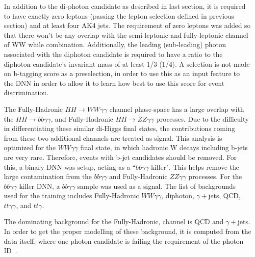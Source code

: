 In addition to the di-photon candidate as described in last section, it is required to have exactly zero leptons (passing the lepton selection defined in previous section) and at least four AK4 jets.
The requirement of zero leptons was added so that there won't be any overlap with the semi-leptonic and fully-leptonic channel of WW while combination.
Additionally, the leading (sub-leading) photon \pt associated with the diphoton candidate is required to have a ratio to the diphoton candidate's 
invariant mass of at least 1/3 (1/4). A selection is not made on b-tagging score as a preselection, in order to use this as an input feature to the DNN in order to allow it to learn how best to use this score for event discrimination.

The Fully-Hadronic $HH\rightarrow WW\gamma\gamma$ channel phase-space has a large overlap with the $HH\rightarrow bb\gamma\gamma$,
and Fully-Hadronic $HH\rightarrow ZZ\gamma\gamma$ processes. Due to the difficulty in differentiating these similar di-Higgs final states, the contributions coming from these two additional channels
are treated as signal. This analysis is optimized for the $WW\gamma\gamma$ final state, in which hadronic W decays including b-jets are very rare. Therefore, events with b-jet candidates should be removed.
For this, a binary DNN was setup, acting as a ``$bb\gamma\gamma$ killer".
This helps remove the large contamination from the $bb\gamma\gamma$ and Fully-Hadronic $ZZ\gamma\gamma$ processes.
For the $bb\gamma\gamma$ killer DNN, a $bb\gamma\gamma$ sample was used as a signal. The list
of backgrounds used for the training includes Fully-Hadronic $WW\gamma\gamma$, diphoton, $\gamma+$jets, QCD, $tt\gamma\gamma$, and $tt\gamma$.

The dominating background for the Fully-Hadronic, channel is QCD and $\gamma+$jets. In order to get the proper modelling of these background, it is computed from the data itself, where one photon candidate is failing the requirement of the photon ID~\cite{Sirunyan:2020sum}.

